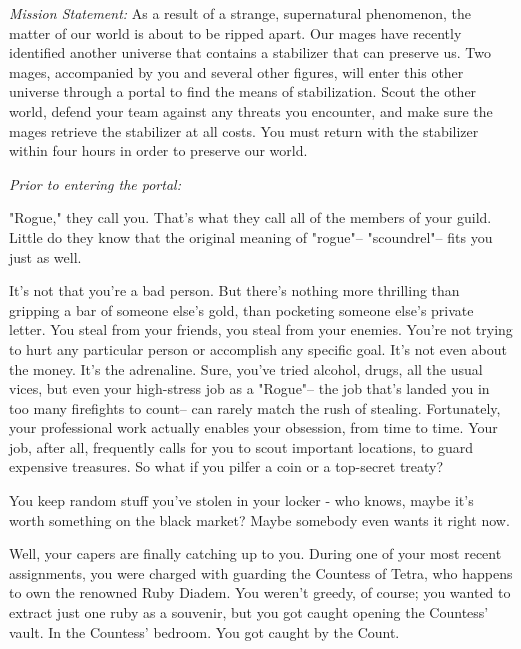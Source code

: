 \documentclass[char]{guildcamp3}
\begin{document}
\name{\cRogueTwo{}}



\emph{Mission Statement:} 
As a result of a strange, supernatural phenomenon, the matter of our world is about to be ripped apart. Our mages have recently identified another universe that contains a stabilizer that can preserve us. Two mages, accompanied by you and several other figures, will enter this other universe through a portal to find the means of stabilization. Scout the other world, defend your team against any threats you encounter, and make sure the mages retrieve the stabilizer at all costs. You must return with the stabilizer within four hours in order to preserve our world.

\emph{Prior to entering the portal:}

"Rogue," they call you. That's what they call all of the members of your guild. Little do they know that the original meaning of "rogue"-- "scoundrel"-- fits you just as well. 

It's not that you're a bad person. But there's nothing more thrilling than gripping a bar of someone else's gold, than pocketing someone else's private letter. You steal from your friends, you steal from your enemies. You're not trying to hurt any particular person or accomplish any specific goal. It's not even about the money. It's the adrenaline. Sure, you've tried alcohol, drugs, all the usual vices, but even your high-stress job as a "Rogue"-- the job that's landed you in too many firefights to count-- can rarely match the rush of stealing. Fortunately, your professional work actually enables your obsession, from time to time. Your job, after all, frequently calls for you to scout important locations, to guard expensive treasures. So what if you pilfer a coin or a top-secret treaty? 

You keep random stuff you've stolen in your locker - who knows, maybe it's worth something on the black market? Maybe somebody even wants it right now.

Well, your capers are finally catching up to you. During one of your most recent assignments, you were charged with guarding the Countess of Tetra, who happens to own the renowned Ruby Diadem. You weren't greedy, of course; you wanted to extract just one ruby as a souvenir, but you got caught opening the Countess' vault. In the Countess' bedroom. You got caught by the Count.
\end{document}
